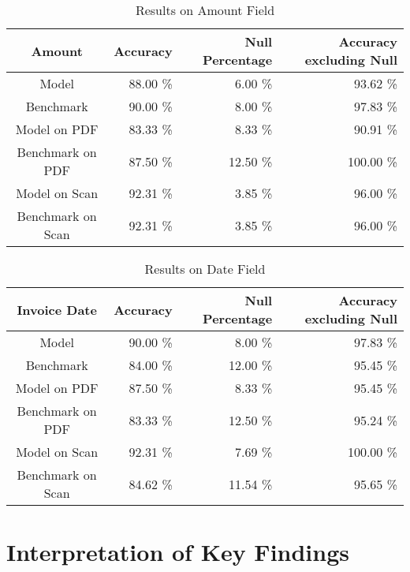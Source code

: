 \begin{table}[ht]   %
    \centering
    \footnotesize
    \begin{tabular}{c|rrr} %
        \toprule    %
        Amount  & Accuracy  & Null Percentage & Accuracy excluding Null \\
        \midrule    %
        Model               & 88.00 \%   & 6.00 \%   & 93.62 \% \\
        Benchmark           & 90.00 \%   & 8.00 \%  & 97.83 \%\\
        \midrule    %
        Model on PDF        & 83.33 \%   & 8.33 \%  & 90.91 \% \\
        Benchmark on PDF    & 87.50 \%   & 12.50 \%  & 100.00 \% \\
        \midrule    %
        Model on Scan       & 92.31 \%  & 3.85 \%   & 96.00 \% \\
        Benchmark on Scan   & 92.31 \%  & 3.85 \%  & 96.00 \% \\

        \bottomrule %
    \end{tabular}
    \caption{Results on Amount Field}
    \label{table:Model_Bench_Amount}
\end{table}
\begin{table}[ht]   %
    \centering
    \footnotesize
    \begin{tabular}{c|rrr} %
        \toprule    %
        Invoice Date  & Accuracy  & Null Percentage & Accuracy excluding Null \\
        \midrule    %
        Model               & 90.00 \%   & 8.00 \%   & 97.83 \% \\
        Benchmark           & 84.00 \%   & 12.00 \%  & 95.45 \%\\
        \midrule    %
        Model on PDF        & 87.50 \%   & 8.33 \%  & 95.45 \% \\
        Benchmark on PDF    & 83.33 \%   & 12.50 \%  & 95.24 \% \\
        \midrule    %
        Model on Scan       & 92.31 \%  & 7.69 \%   & 100.00 \% \\
        Benchmark on Scan   & 84.62 \%  & 11.54 \%  & 95.65 \% \\

        \bottomrule %
    \end{tabular}
    \caption{Results on Date Field}
    \label{table:Model_Bench_Date}
\end{table}

\section{Interpretation of Key Findings}
